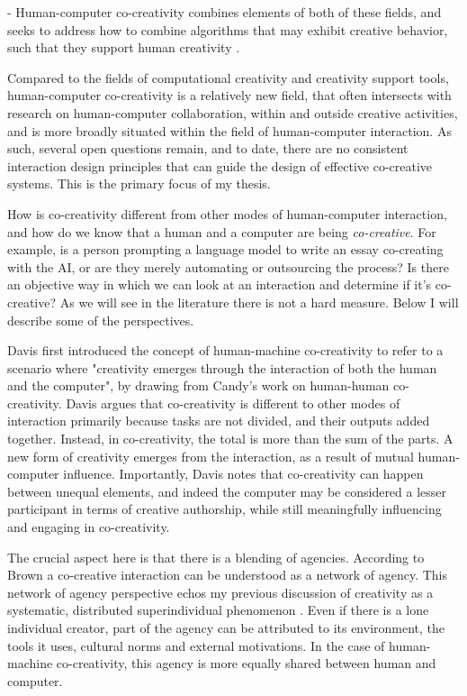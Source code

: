 - Human-computer co-creativity combines elements of both of these fields, and seeks to address how to combine algorithms that may exhibit creative behavior, such that they support human creativity \cite{Kantosalo2019-pz, Deterding2017-wh}. 

Compared to the fields of computational creativity and creativity support tools, human-computer co-creativity is a relatively new field, that often intersects with research on human-computer collaboration, within and outside creative activities, and is more broadly situated within the field of human-computer interaction. As such, several open questions remain, and to date, there are no consistent interaction design principles that can guide the design of effective co-creative systems. This is the primary focus of my thesis. 

 How is co-creativity different from other modes of human-computer interaction, and how do we know that a human and a computer are being \textit{co-creative}. For example, is a person prompting a language model to write an essay co-creating with the AI, or are they merely automating or outsourcing the process? Is there an objective way in which we can look at an interaction and determine if it's co-creative? As we will see in the literature there is not a hard measure. Below I will describe some of the perspectives. 

Davis first introduced the concept of human-machine co-creativity \cite{Davis2013-jy} to refer to a scenario where "creativity emerges through the interaction of both the human and the computer", by drawing from Candy's \cite{Candy2002-ra} work on human-human co-creativity. Davis argues that co-creativity is different to other modes of interaction primarily because tasks are not divided, and their outputs added together. Instead, in co-creativity, the total is more than the sum of the parts. A new form of creativity emerges from the interaction, as a result of mutual human-computer influence. Importantly, Davis notes that co-creativity can happen between unequal elements, and indeed the computer may be considered a lesser participant in terms of creative authorship, while still meaningfully influencing and engaging in co-creativity. 

The crucial aspect here is that there is a blending of agencies. According to Brown \cite{Brown2016-tc} a co-creative interaction can be understood as a network of agency. This network of agency perspective echos my previous discussion of creativity as a systematic, distributed superindividual phenomenon \cite{Bown2012-gg, Schaffer1994-gy, Csikszentmihalyi2015-rq, Csikszentmihalyi2014-cq, Amabile1996-pt, Rhodes1961-od}. Even if there is a lone individual creator, part of the agency can be attributed to its environment, the tools it uses, cultural norms and external motivations. In the case of human-machine co-creativity, this agency is more equally shared between human and computer. 

